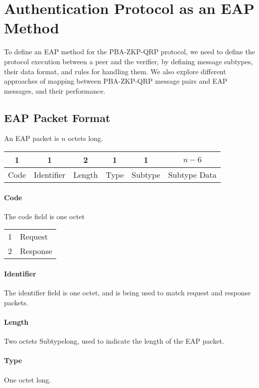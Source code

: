 \section{Authentication Protocol as an EAP Method}
To define an EAP method for the PBA-ZKP-QRP protocol, we need to define the protocol execution between a peer and the verifier, by defining message subtypes, their data format, and rules for handling them.
We also explore different approaches of mapping between PBA-ZKP-QRP message pairs and EAP messages, and their performance.

\subsection{EAP Packet Format}
An EAP packet is $n$ octets long.

\begin{center}
\begin{tabular}{|c|c|c|c|c|c|}
	\hline
	1 & 1 & 2 & 1 & 1 & $n - 6$\\
	\hline
	Code & Identifier & Length & Type & Subtype & Subtype Data\\
	\hline 
\end{tabular}
\end{center}

\paragraph{Code}
The code field is one octet

\bigskip

\begin{tabular}{ll}
	1 & Request \\
	2 & Response\\
\end{tabular}

\paragraph{Identifier} The identifier field is one octet, and is being used to match request and response packets.

\paragraph{Length} Two octets Subtypelong, used to indicate the length of the EAP packet.

\paragraph{Type} One octet long.

